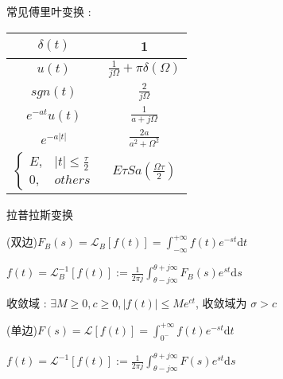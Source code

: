 \documentclass[UTF8, 12pt]{ctexart}
\begin{document}
		常见傅里叶变换 :
		\begin{table}[ht]
			\begin{tabular}{|c|c|}
				\hline
				$ \delta(t) $ & 1 \\ \hline
				$ u(t) $ & $ \frac{1}{j\Omega} + \pi\delta(\Omega) $ \\ \hline
				$ sgn(t) $ & $ \frac{2}{j\Omega} $ \\ \hline
				$ e^{-at}u(t) $ & $ \frac{1}{a+j\Omega} $ \\ \hline
				$ e^{-a|t|} $ & $ \frac{2a}{a^{2}+\Omega^{2}} $ \\ \hline
				$ \begin{cases} E,& |t| \leq \frac{\tau}{2} \\ 0,& others \end{cases} $ & $ E\tau Sa(\frac{\Omega\tau}{2}) $ \\ \hline
			\end{tabular}
		\end{table}

	\noindent 拉普拉斯变换
		
		(双边)$ F_{B}(s) = \mathscr{L}_{B}[f(t)] = \int_{-\infty}^{+\infty}f(t)e^{-st}\mathrm{d}t $

		$ f(t) = \mathscr{L}_{B}^{-1}[f(t)] := \frac{1}{2\pi j}\int_{\theta-j\infty}^{\theta+j\infty}F_{B}(s)e^{st}\mathrm{d}s $

		收敛域 : $ \exists M \geq 0, c \geq 0, |f(t)| \leq Me^{ct} $, 收敛域为 $ \sigma > c $

		(单边)$ F(s) = \mathscr{L}[f(t)] = \int_{0^{-}}^{+\infty}f(t)e^{-st}\mathrm{d}t $

		$ f(t) = \mathscr{L}^{-1}[f(t)] := \frac{1}{2\pi j}\int_{\theta-j\infty}^{\theta+j\infty}F(s)e^{st}\mathrm{d}s $
\end{document}
